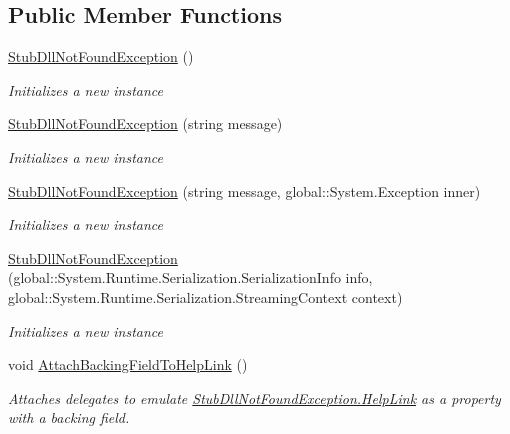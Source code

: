 \subsection*{Public Member Functions}
\begin{DoxyCompactItemize}
\item 
\hyperlink{class_system_1_1_fakes_1_1_stub_dll_not_found_exception_a6e2fc9930141cd1904d5a3e26946b26e}{Stub\-Dll\-Not\-Found\-Exception} ()
\begin{DoxyCompactList}\small\item\em Initializes a new instance\end{DoxyCompactList}\item 
\hyperlink{class_system_1_1_fakes_1_1_stub_dll_not_found_exception_a13e74a94b44e27d3dc2d92d976e48ddb}{Stub\-Dll\-Not\-Found\-Exception} (string message)
\begin{DoxyCompactList}\small\item\em Initializes a new instance\end{DoxyCompactList}\item 
\hyperlink{class_system_1_1_fakes_1_1_stub_dll_not_found_exception_ad82cc1706532e8ef6801dbe96e4c7b7b}{Stub\-Dll\-Not\-Found\-Exception} (string message, global\-::\-System.\-Exception inner)
\begin{DoxyCompactList}\small\item\em Initializes a new instance\end{DoxyCompactList}\item 
\hyperlink{class_system_1_1_fakes_1_1_stub_dll_not_found_exception_adf66037f6dff9bc3b1a42143afb7fc73}{Stub\-Dll\-Not\-Found\-Exception} (global\-::\-System.\-Runtime.\-Serialization.\-Serialization\-Info info, global\-::\-System.\-Runtime.\-Serialization.\-Streaming\-Context context)
\begin{DoxyCompactList}\small\item\em Initializes a new instance\end{DoxyCompactList}\item 
void \hyperlink{class_system_1_1_fakes_1_1_stub_dll_not_found_exception_a09cf6a874eb7d2fd498dfcc37c3d4203}{Attach\-Backing\-Field\-To\-Help\-Link} ()
\begin{DoxyCompactList}\small\item\em Attaches delegates to emulate \hyperlink{class_system_1_1_fakes_1_1_stub_dll_not_found_exception_a14b8bf17b4d0a0ab52212d145e38c78d}{Stub\-Dll\-Not\-Found\-Exception.\-Help\-Link} as a property with a backing field.\end{DoxyCompactList}\item 

\end{DoxyCompactItemize}
